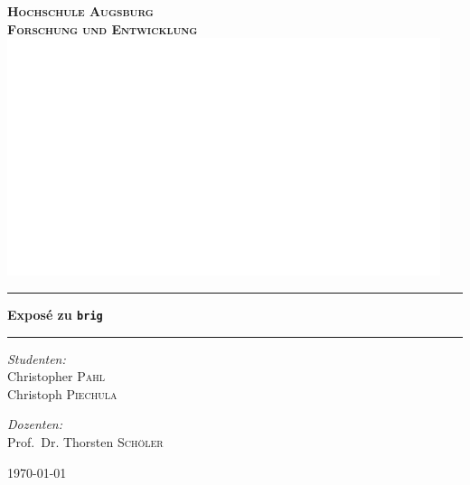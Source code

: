\begin{titlepage}
\pagecolor{titlepagecolor}
\begin{center}

\bf
\color{titlepagefontcolor}
\textsc{\huge Hochschule Augsburg}\\[1.5cm]
\textsc{\LARGE Forschung und Entwicklung}\\[0.5cm]
\vspace{1em}
\includegraphics[width=0.95\textwidth]{images/title.png}~\\[1cm]

\rule{\linewidth}{0.5mm}
{\Huge \bfseries Exposé zu \frqq\texttt{brig}\flqq\\[0.4cm]}
\rule{\linewidth}{0.5mm}

\noindent
\begin{minipage}[t]{0.4\textwidth}
\begin{flushleft} \Large
\emph{Studenten:}\\
\textnormal{Christopher \textsc{Pahl}} \\
\textnormal{Christoph \textsc{Piechula}}
\end{flushleft}
\end{minipage}%
\begin{minipage}[t]{0.4\textwidth}
\begin{flushright} \Large
\emph{Dozenten:} \\
\textnormal{Prof.\ Dr. Thorsten \textsc{Schöler}} \\
\end{flushright}
\end{minipage}

\vfill

{\large \today}
\end{center}
\end{titlepage}
\nopagecolor
